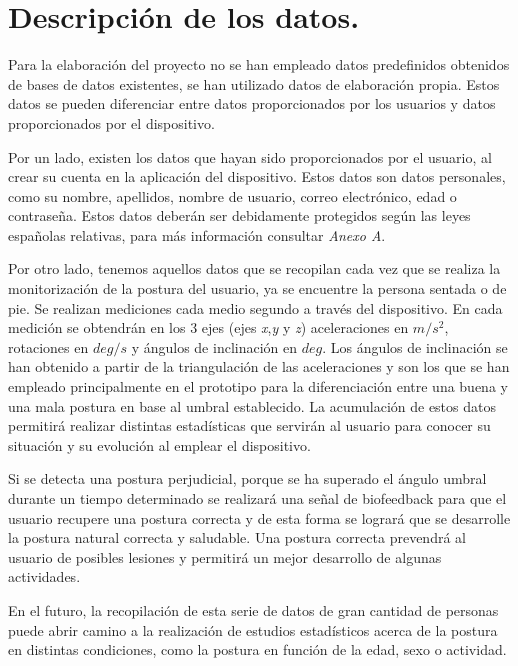 
\section{Descripción de los datos.}

Para la elaboración del proyecto no se han empleado datos predefinidos obtenidos de bases de datos existentes, se han utilizado datos de elaboración propia. Estos datos se pueden diferenciar entre datos proporcionados por los usuarios y datos proporcionados por el dispositivo.

Por un lado, existen los datos que hayan sido proporcionados por el usuario, al crear su cuenta en la aplicación del dispositivo. Estos datos son datos personales, como su nombre, apellidos, nombre de usuario, correo electrónico, edad o contraseña. Estos datos deberán ser debidamente protegidos según las leyes españolas relativas, para más información consultar \textit{Anexo A}.

Por otro lado, tenemos aquellos datos que se recopilan cada vez que se realiza la monitorización de la postura del usuario, ya se encuentre la persona sentada o de pie. Se realizan mediciones cada medio segundo a través del dispositivo. En cada medición se obtendrán en los 3 ejes (ejes \textit{x},\textit{y} y \textit{z}) aceleraciones en $m/s^{2}$, rotaciones en $deg/s$ y ángulos de inclinación en $deg$. Los ángulos de inclinación se han obtenido a partir de la triangulación de las aceleraciones y son los que se han empleado principalmente en el prototipo para la diferenciación entre una buena y una mala postura en base al umbral establecido. La acumulación de estos datos permitirá realizar distintas estadísticas que servirán al usuario para conocer su situación y su evolución al emplear el dispositivo.

Si se detecta una postura perjudicial, porque se ha superado el ángulo umbral durante un tiempo determinado se realizará una señal de biofeedback para que el usuario recupere una postura correcta y de esta forma se logrará que se desarrolle la postura natural correcta y saludable. Una postura correcta prevendrá al usuario de posibles lesiones y permitirá un mejor desarrollo de algunas actividades.

En el futuro, la recopilación de esta serie de datos de gran cantidad de personas puede abrir camino a la realización de estudios estadísticos acerca de la postura en distintas condiciones, como la postura en función de la edad, sexo o actividad.

